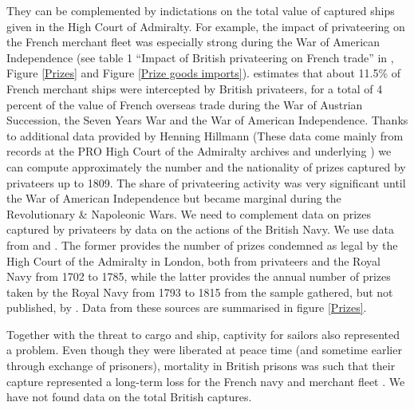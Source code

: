 \documentclass[12pt,a4paper,notitlepage,english]{article}
\begin{document}
They can be complemented by indictations on the total value of captured ships given in the High Court of Admiralty. For example, the impact of privateering on the French merchant fleet was especially strong during the War of American Independence (see table 1 ``Impact of British privateering on French trade'' in \cite{Hillmann2011}, Figure \ref{Prizes} and Figure \ref{Prize goods imports}).
\cite{Hillmann2011} estimates that about 11.5\% of French merchant ships were intercepted by British privateers, for a total of 4 percent of the value of French overseas trade during the War of Austrian Succession, the Seven Years War and the War of American Independence.
Thanks to additional data provided by Henning Hillmann (These data come mainly from records at the PRO High Court of the Admiralty archives and underlying \cite{Hillmann2011}) we can compute approximately the number and the nationality of prizes captured by privateers up to 1809.
The share of privateering activity was very significant until the War of American Independence but became marginal during the Revolutionary \& Napoleonic Wars.
We need to complement data on prizes captured by privateers by data on the actions of the British Navy.
We use data from \cite{Starkey1990} and \cite{Benjamin2009}. 
The former provides the number of prizes condemned as legal by the High Court of the Admiralty in London, both from privateers and the Royal Navy from 1702 to 1785, while the latter provides the annual number of prizes taken by the Royal Navy from 1793 to 1815 from the sample gathered, but not published, by \cite{Hill1998}.
Data from these sources are summarised in figure \ref{Prizes}.




Together with the threat to cargo and ship, captivity for sailors also represented a problem. Even though they were liberated at peace time (and sometime earlier through exchange of prisoners), mortality in British prisons was such that their capture represented a long-term loss for the French navy and merchant fleet \citep{LeGoff1998}. We have not found data on the total British captures.

\end{document}
